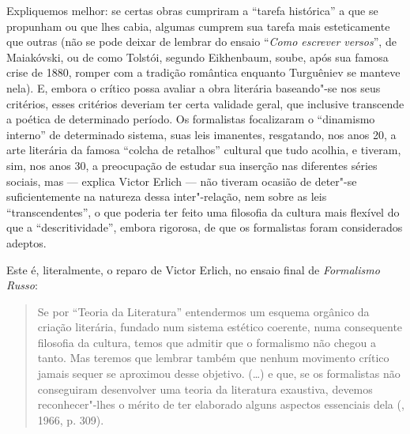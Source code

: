 Expliquemos melhor: se certas obras cumpriram a
``tarefa histórica'' a que se propunham ou que lhes cabia, algumas cumprem sua tarefa mais
esteticamente que outras (não se pode deixar de lembrar do ensaio ``\emph{Como escrever versos}'', de
Maiakóvski, ou de como Tolstói, segundo Eikhenbaum, soube, após sua
famosa crise de 1880, romper com a tradição romântica enquanto
Turguêniev se manteve nela). E, embora o crítico possa avaliar a obra
literária baseando"-se nos seus critérios, esses critérios deveriam ter
certa validade geral, que inclusive transcende a poética de determinado
período. Os formalistas focalizaram o ``dinamismo interno'' de determinado sistema, suas leis imanentes, resgatando, nos anos 20, a
arte literária da famosa ``colcha de retalhos'' cultural que tudo
acolhia, e tiveram, sim, nos anos 30, a preocupação de estudar sua
inserção nas diferentes séries sociais, mas --- explica Victor Erlich ---
não tiveram ocasião de deter"-se suficientemente na natureza dessa
inter"-relação, nem sobre as leis ``transcendentes'', o que poderia
ter feito uma filosofia da cultura mais flexível do que a
``descritividade'', embora rigorosa, de que os formalistas foram considerados
adeptos.

Este é, literalmente, o reparo de Victor Erlich, no ensaio final de
\emph{Formalismo Russo}:

\begin{quotation}
Se por ``Teoria da Literatura'' entendermos um esquema orgânico da
criação literária, fundado num sistema estético coerente, numa
consequente filosofia da cultura, temos que admitir que o formalismo não
chegou a tanto. Mas teremos que lembrar também que nenhum movimento
crítico jamais sequer se aproximou desse objetivo. (\ldots{}) e que, se os
formalistas não conseguiram desenvolver uma teoria da literatura
exaustiva, devemos reconhecer"-lhes o mérito de ter elaborado alguns
aspectos essenciais dela (, 1966, p. 309).
\end{quotation}

